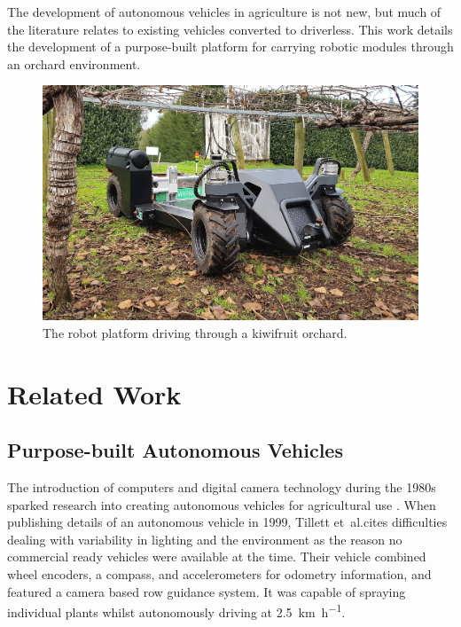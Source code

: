 \documentclass[preprint,authoryear,12pt]{elsarticle}
\begin{document}
    The development of autonomous vehicles in agriculture is not new, but much of the literature relates to existing vehicles converted to driverless.
    This work details the development of a purpose-built platform for carrying robotic modules through an orchard environment.

    \begin{figure}[htb]
        \centering
        \includegraphics[width=\linewidth]{imgs/photos/suzy_general.jpg}
        \caption{
            The robot platform driving through a kiwifruit orchard.
        }
        \label{fig:suzy}
    \end{figure}

\section{Related Work}
\label{sect:review}

    \subsection{Purpose-built Autonomous Vehicles}

        The introduction of computers and digital camera technology during the 1980s sparked research into creating autonomous vehicles for agricultural use \cite{Li2009}.
        When publishing details of an autonomous vehicle in 1999, Tillett et~al.\@ cites difficulties dealing with variability in lighting and the environment as the reason no commercial ready vehicles were available at the time.
        Their vehicle combined wheel encoders, a compass, and accelerometers for odometry information, and featured a camera based row guidance system.
        It was capable of spraying individual plants whilst autonomously driving at \SI{2.5}{\kilo\meter\per\hour}.
\end{document}
